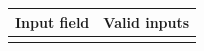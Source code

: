 \documentclass[12pt]{article}
\theoremstyle{definition}
\begin{document}
\begin{figure}[!h]
\begin{floatrow}
           \end{floatrow}
        \end{figure}
\begin{tabular}{|l|l|}
\hline
Input field & Valid inputs \\ \hline
 &  \\ \hline
\end{tabular}
\end{document}
